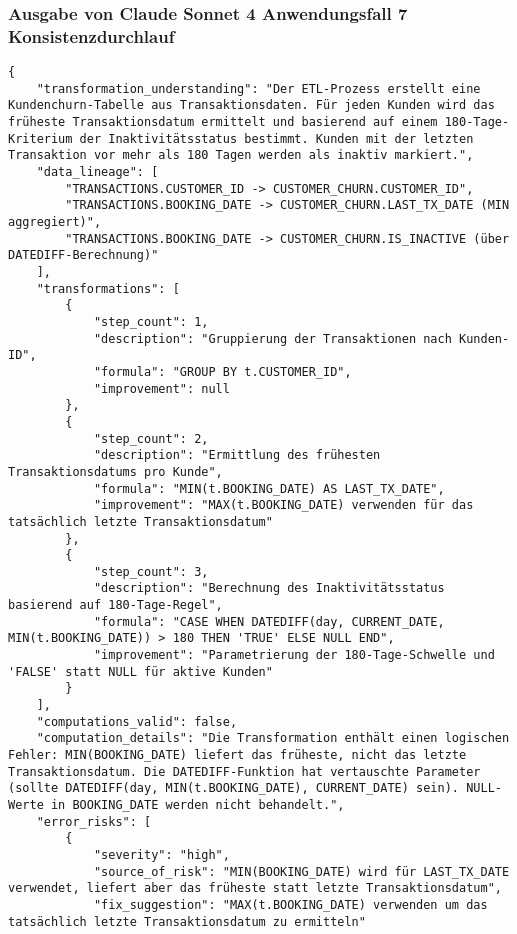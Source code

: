 \subsubsection{Ausgabe von Claude Sonnet 4 Anwendungsfall 7 Konsistenzdurchlauf}\label{anhang:subsubsec:claude_case7_prompt2}
\begin{lstlisting}[caption={Ausgabe: Claude Sonnet 4 Anwendungsfall 7 Konsistenzdurchlauf},label={claude_case7_prompt2}]
{
    "transformation_understanding": "Der ETL-Prozess erstellt eine Kundenchurn-Tabelle aus Transaktionsdaten. Für jeden Kunden wird das früheste Transaktionsdatum ermittelt und basierend auf einem 180-Tage-Kriterium der Inaktivitätsstatus bestimmt. Kunden mit der letzten Transaktion vor mehr als 180 Tagen werden als inaktiv markiert.",
    "data_lineage": [
        "TRANSACTIONS.CUSTOMER_ID -> CUSTOMER_CHURN.CUSTOMER_ID",
        "TRANSACTIONS.BOOKING_DATE -> CUSTOMER_CHURN.LAST_TX_DATE (MIN aggregiert)",
        "TRANSACTIONS.BOOKING_DATE -> CUSTOMER_CHURN.IS_INACTIVE (über DATEDIFF-Berechnung)"
    ],
    "transformations": [
        {
            "step_count": 1,
            "description": "Gruppierung der Transaktionen nach Kunden-ID",
            "formula": "GROUP BY t.CUSTOMER_ID",
            "improvement": null
        },
        {
            "step_count": 2,
            "description": "Ermittlung des frühesten Transaktionsdatums pro Kunde",
            "formula": "MIN(t.BOOKING_DATE) AS LAST_TX_DATE",
            "improvement": "MAX(t.BOOKING_DATE) verwenden für das tatsächlich letzte Transaktionsdatum"
        },
        {
            "step_count": 3,
            "description": "Berechnung des Inaktivitätsstatus basierend auf 180-Tage-Regel",
            "formula": "CASE WHEN DATEDIFF(day, CURRENT_DATE, MIN(t.BOOKING_DATE)) > 180 THEN 'TRUE' ELSE NULL END",
            "improvement": "Parametrierung der 180-Tage-Schwelle und 'FALSE' statt NULL für aktive Kunden"
        }
    ],
    "computations_valid": false,
    "computation_details": "Die Transformation enthält einen logischen Fehler: MIN(BOOKING_DATE) liefert das früheste, nicht das letzte Transaktionsdatum. Die DATEDIFF-Funktion hat vertauschte Parameter (sollte DATEDIFF(day, MIN(t.BOOKING_DATE), CURRENT_DATE) sein). NULL-Werte in BOOKING_DATE werden nicht behandelt.",
    "error_risks": [
        {
            "severity": "high",
            "source_of_risk": "MIN(BOOKING_DATE) wird für LAST_TX_DATE verwendet, liefert aber das früheste statt letzte Transaktionsdatum",
            "fix_suggestion": "MAX(t.BOOKING_DATE) verwenden um das tatsächlich letzte Transaktionsdatum zu ermitteln"

\end{lstlisting}
